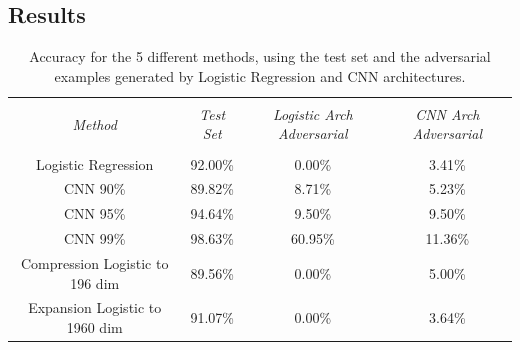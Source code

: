 \documentclass{asaproc}
\begin{document}
\subsection*{Results}

\begin{table}
	\caption{\enspace Accuracy for the 5 different methods, using the test set and the adversarial examples generated by Logistic Regression and CNN architectures.}
	\label{tab1}
	\begin{tabular*}{\hsize}{@{\extracolsep{\fill}}cccc}
		\hline
		\\[-7pt]
		\multicolumn{1}{c}{\it Method}                    & 
		\multicolumn{1}{c}{\it Test Set}                  & 
		\multicolumn{1}{c}{\it Logistic Arch Adversarial} & 
		\multicolumn{1}{c}{\it CNN Arch Adversarial}      \\
		\hline
		\\[-5pt]
		Logistic Regression      & 92.00\% & 0.00\%  & 3.41\%  \\
		CNN 90\%                 & 89.82\% & 8.71\%  & 5.23\%  \\
		CNN 95\%                 & 94.64\% & 9.50\%  & 9.50\%  \\
		CNN 99\%                 & 98.63\% & 60.95\% & 11.36\% \\
		Compression Logistic to 196 dim & 89.56\% & 0.00\%  & 5.00\%  \\
		Expansion Logistic to 1960 dim  & 91.07\% & 0.00\%  & 3.64\% 
	\end{tabular*}
\end{table}
\end{document}
